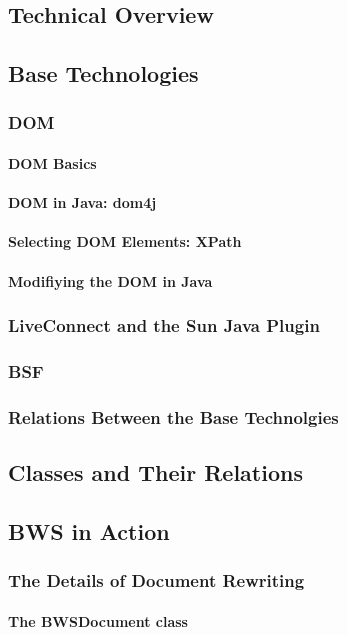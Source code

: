  \subsection{Technical Overview}
 \subsection{Base Technologies}
  \subsubsection{DOM}
   \paragraph{DOM Basics}
   \paragraph{DOM in Java: dom4j}
   \paragraph{Selecting DOM Elements: XPath}
   \paragraph{Modifiying the DOM in Java}
  \subsubsection{LiveConnect and the Sun Java Plugin}
  \subsubsection{BSF}
  \subsubsection{Relations Between the Base Technolgies}
 \subsection{Classes and Their Relations}
 \subsection{BWS in Action}
  \subsubsection{The Details of Document Rewriting}
   \paragraph{The BWSDocument class}

